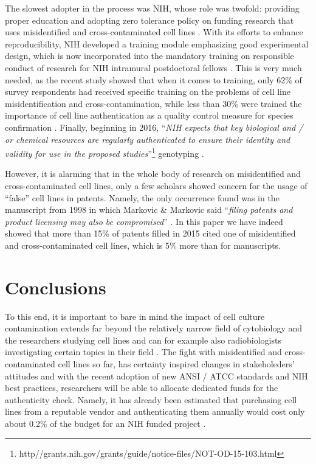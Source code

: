 \documentclass[12pt]{article}
\begin{document}
The slowest adopter in the process was NIH, whose role was twofold: providing proper education and adopting zero tolerance policy on funding research that uses misidentified and cross-contaminated cell lines \cite{lorsch2014fixing}. With its efforts to enhance reproducibility, NIH developed a training module emphasizing good experimental design, which is now incorporated into the mandatory training on responsible conduct of research for NIH intramural postdoctoral fellows \cite{collins2014nih}. This is very much needed, as the recent study showed that when it comes to training, only 62\% of survey respondents had received specific training on the problems of cell line misidentification and cross-contamination, while less than 30\% were trained the importance of cell line authentication as a quality control measure for species confirmation \cite{freedman2014culture}. Finally, beginning in 2016, ``\textit{NIH expects that key biological and / or chemical resources are regularly authenticated to ensure their identity and validity for use in the proposed studies}''\footnote{http//grants.nih.gov/grants/guide/notice-files/NOT-OD-15-103.html}  genotyping \cite{masters2012authentication}.

However, it is alarming that in the whole body of research on misidentified and cross-contaminated cell lines, only a few scholars showed concern for the usage of ``false'' cell lines in patents. Namely, the only occurrence found was in the manuscript from 1998 in which Markovic \& Markovic said ``\textit{filing patents and product licensing may also be compromised}'' \cite{markovic1998cell}. In this paper we have indeed showed that more than 15\% of patents filled in 2015 cited one of misidentified and cross-contaminated cell lines, which is 5\% more than for manuscripts.

\section*{Conclusions}
To this end, it is important to bare in mind the impact of cell culture contamination extends far beyond the relatively narrow field of cytobiology and the researchers studying cell lines and can for example also  radiobiologists investigating certain topics in their field \cite{lucey2009henrietta}. The fight with misidentified and cross-contaminated cell lines so far, has certainty inspired changes in stakeholeders' attitudes and with the recent adoption of new ANSI / ATCC standards and NIH best practices, researchers will be able to allocate dedicated funds for the authenticity check. Namely, it has already been estimated that purchasing cell lines from a reputable vendor and authenticating them annually would cost only about 0.2\% of the budget for an NIH funded project \cite{freedman2015economics}. 
\end{document}
